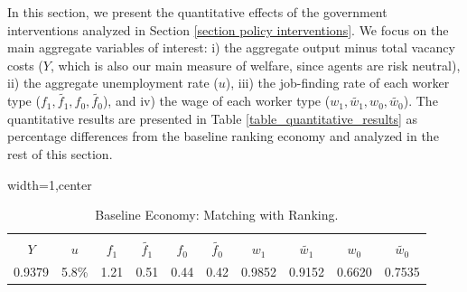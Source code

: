 \documentclass[12pt]{article} %
\theoremstyle{definition}
\begin{document}
In this section, we present the quantitative effects of the government interventions analyzed in Section \ref{section policy interventions}.
We focus on the main aggregate variables of interest: i) the aggregate output minus total vacancy costs ($Y$, which is also our main measure of welfare, since agents are risk neutral), ii) the aggregate unemployment rate ($u$), iii) the job-finding rate of each worker type ($f_{1}, \tilde{f_{1}}, f_{0}, \tilde{f_{0}}$), and iv) the wage of each worker type ($w_{1}, \tilde{w_{1}}, w_{0}, \tilde{w_{0}}$).
The quantitative results are presented in Table \ref{table_quantitative_results} as percentage differences from the baseline ranking economy and analyzed in the rest of this section.

\begin{table}[h!]

\begin{adjustbox}{width=1\columnwidth,center}

 \begin{tabular}{||c c c c c c c c c c||} 
 \hline 
 \\[-1.1em]
 \textbf{$Y$} & \textbf{$u$} & \textbf{$f_{1}$} & \textbf{$\tilde{f_1}$} & \textbf{$f_{0}$} & \textbf{$\tilde{f_0}$} & \textbf{$w_{1}$} & \textbf{$\tilde{w_1}$} & \textbf{$w_{0}$} & \textbf{$\tilde{w_0}$}   \\  
 \hline\hline
  0.9379 & 5.8\% & 1.21 & 0.51 & 0.44 & 0.42 & 0.9852  & 0.9152  & 0.6620  &  0.7535 \\ [1ex] 
 \hline
 \end{tabular}
\end{adjustbox}
\centering
\caption{Baseline Economy: Matching with Ranking.} \label{table_baseline_economy}
\end{table} 
\end{document}

